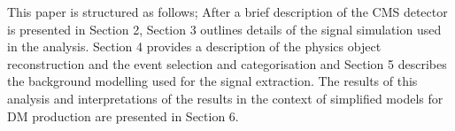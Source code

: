 

This paper is structured as follows; After a brief description of the CMS detector is presented in Section 2, Section 3 outlines details of the signal simulation 
used in the analysis. Section 4 provides a description of the physics object reconstruction and the event selection and categorisation and Section 5 describes the 
background modelling used for the signal extraction. The results of this analysis and interpretations of the results in the context of simplified models for DM 
production are presented in Section 6.

